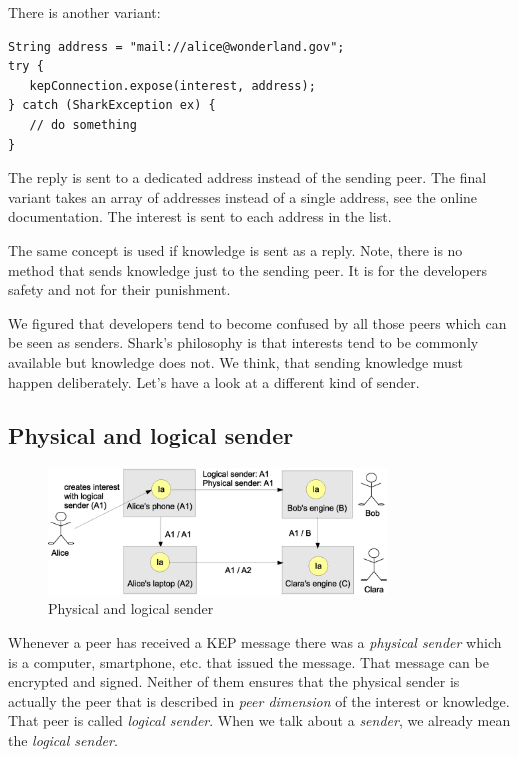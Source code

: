 There is another variant:

\begin{verbatim}
String address = "mail://alice@wonderland.gov";
try {
   kepConnection.expose(interest, address);
} catch (SharkException ex) {
   // do something
}
\end{verbatim}

The reply is sent to a dedicated address instead of the sending peer. The final variant takes an array of addresses instead of a single address, see the online documentation. The interest is sent to each address in the list.

The same concept is used if knowledge is sent as a reply. Note, there is no method that sends knowledge just to the sending peer. It is for the developers safety and not for their punishment.

We figured that developers tend to become confused by all those peers which can be seen as senders. Shark's philosophy is that interests tend to be commonly available but knowledge does not. We think, that sending knowledge must happen deliberately. Let's have a look at a different kind of sender.

\subsection{Physical and logical sender}
\label{sec:knowledgePorts:sender}

\begin{figure}[t]
\centering
\includegraphics[width=0.80\textwidth]{physicalAndLogicalSender.eps}
\caption{Physical and logical sender}
\label{fig:physicalAndLogicalSender}
\end{figure}

Whenever a peer has received a KEP message there was a {\it physical sender} which is a computer, smartphone, etc. that issued the message. That message can be encrypted and signed. Neither of them ensures that the physical sender is actually the peer that is described in {\it peer dimension} of the interest or knowledge. That peer is called {\it logical sender}. When we talk about a {\it sender}, we already mean the {\it logical sender}.


